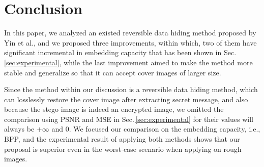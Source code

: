 \section{Conclusion}
\label{sec:conclusion}

In this paper, we analyzed an existed reversible data hiding method proposed by Yin et al., and we proposed three improvements, within which, two of them have significant incremental in embedding capacity that has been shown in Sec.\,\ref{sec:experimental}, while the last improvement aimed to make the method more stable and generalize so that it can accept cover images of larger size. 

Since the method within our discussion is a reversible data hiding method, 
which can losslessly restore the cover image after extracting secret message, 
and also because the stego image is indeed an encrypted image, 
we omitted the comparison using PSNR and MSE in Sec.\,\ref{sec:experimental} for their values will always be $+\infty$ and $0$.
We focused our comparison on the embedding capacity, i.e., BPP, and the experimental result of applying both methods shows that our proposal is superior even in the worst-case scenario when applying on rough images. 